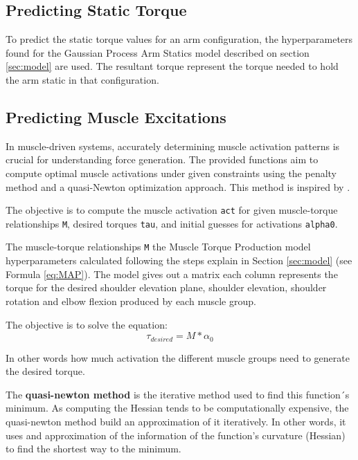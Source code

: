 \subsection{Predicting Static Torque}

To predict the static torque values for an arm configuration, the hyperparameters found for the Gaussian Process Arm Statics model described on section \ref{sec:model} are used. The resultant torque represent the torque needed to hold the arm static in that configuration.

\subsection{Predicting Muscle Excitations}\label{computemuscleexcitation}

In muscle-driven systems, accurately determining muscle activation patterns is crucial for understanding force generation. The provided functions aim to compute optimal muscle activations under given constraints using the penalty method and a quasi-Newton optimization approach. This method is inspired by \cite{QSC}.

The objective is to compute the muscle activation \texttt{act} for given muscle-torque relationships \texttt{M}, desired torques \texttt{tau}, and initial guesses for activations \texttt{alpha0}.

The muscle-torque relationships \texttt{M} the Muscle Torque Production model hyperparameters calculated following the steps explain in Section \ref{sec:model} (see Formula \ref{eq:MAP}). The model gives out a matrix each column represents the torque for the desired shoulder elevation plane, shoulder elevation, shoulder rotation and elbow flexion produced by each muscle group. 

The objective is to solve the equation:
\begin{equation}
    \tau_{desired} = M * \alpha_0
\end{equation}

In other words how much activation the different muscle groups need to generate the desired torque. 

The \textbf{quasi-newton method} is the iterative method used to find this function´s minimum. As computing the Hessian tends to be computationally expensive, the quasi-newton method build an approximation of it iteratively. In other words, it uses and approximation of the information of the function's curvature (Hessian) to find the shortest way to the minimum. 

